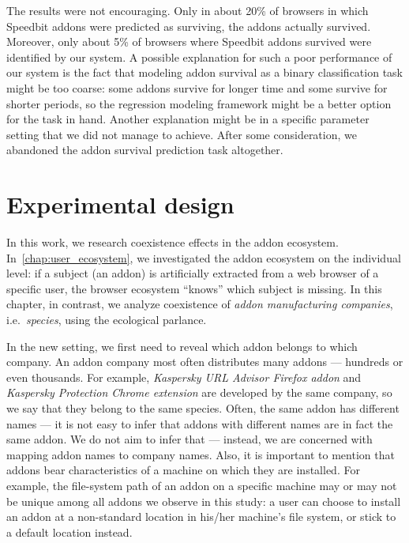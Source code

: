 \documentclass[11pt,oneside]{book}
\let\Oldsection\section
\renewcommand{\section}{\FloatBarrier\Oldsection}
\begin{document}
The results were not encouraging. Only in about 20\% of browsers in which Speedbit addons were predicted as surviving, the addons actually survived. Moreover, only about 5\% of browsers where Speedbit addons survived were identified by our system. A possible explanation for such a poor performance of our system is the fact that modeling addon survival as a binary classification task might be too coarse: some addons survive for longer time and some survive for shorter periods, so the regression modeling framework might be a better option for the task in hand. Another explanation might be in a specific parameter setting that we did not manage to achieve. After some consideration, we abandoned the addon survival prediction task altogether.

\section{Experimental design}
\label{sec:experiment_des}

In this work, we research coexistence effects in the addon ecosystem. In~\autoref{chap:user_ecosystem}, we investigated the addon ecosystem on the individual level: if a subject (an addon) is artificially extracted from a web browser of a specific user, the browser ecosystem ``knows'' which subject is missing. In this chapter, in contrast, we analyze coexistence of \emph{addon manufacturing companies}, i.e.~\emph{species}, using the ecological parlance. 

In the new setting, we first need to reveal which addon belongs to which company. An addon company most often distributes many addons --- hundreds or even thousands. For example, \emph{Kaspersky URL Advisor Firefox addon} and \emph{Kaspersky Protection Chrome extension} are developed by the same company, so we say that they belong to the same species. Often, the same addon has different names --- it is not easy to infer that addons with different names are in fact the same addon. We do not aim to infer that --- instead, we are concerned with mapping addon names to company names. Also, it is important to mention that addons bear characteristics of a machine on which they are installed. For example, the file-system path of an addon on a specific machine may or may not be unique among all addons we observe in this study: a user can choose to install an addon at a non-standard location in his/her machine's file system, or stick to a default location instead.
\end{document}
